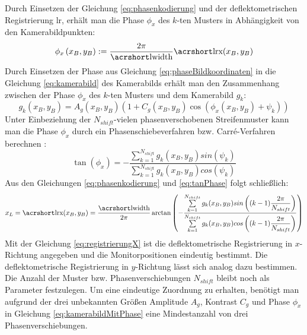 \p
Durch Einsetzen der Gleichung \ref{eq:phasenkodierung} und der deflektometrischen Registrierung \acrshort{lr}, erhält man die Phase $\phi_x$ des $k$-ten Musters in Abhängigkeit von den Kamerabildpunkten:
%
\begin{equation}\label{eq:phaseBildkoordinaten}
	\phi_x\left(x_B,y_B\right) := \dfrac{2\pi}{\acrshortmath{lwidth}}\acrshortmath{lrx}(x_B, y_B)
\end{equation}
%
Durch Einsetzen der Phase aus Gleichung \ref{eq:phaseBildkoordinaten} in die Gleichung \ref{eq:kamerabild} des Kamerabilds erhält man den Zusammenhang zwischen der Phase $\phi_x$ des $k$-ten Musters und dem Kamerabild $g_k$:
%
\begin{equation}\label{eq:kamerabildMitPhase}
	g_k(x_B, y_B) = A_g(x_B, y_B) \left(1 + C_g(x_B, y_B) \cos \left(\phi_x(x_B, y_B) + \psi_k\right)\right)
\end{equation}
%
Unter Einbeziehung der $N_{shift}$-vielen phasenverschobenen Streifenmuster kann man die Phase $\phi_x$ durch ein Phasenschiebeverfahren bzw. Carré-Verfahren berechnen \cite{carre}\cite{kit_werling}:
%
\begin{equation}\label{eq:tanPhase}
	\tan (\phi_x) = -\dfrac{\sum\limits_{k=1}^{N_{shift}} g_k(x_B, y_B) sin(\psi_k)}{\sum\limits_{k=1}^{N_{shift}} g_k(x_B, y_B) cos(\psi_k)}
\end{equation}
%
Aus den Gleichungen \ref{eq:phasenkodierung} und \ref{eq:tanPhase} folgt schließlich:
%
\begin{equation}\label{eq:registrierungX}
	x_L = \acrshortmath{lrx}(x_B, y_B) = 
	\dfrac{\acrshortmath{lwidth}}{2\pi}
	\arctan 
	\left( 
		-\dfrac
		{\sum\limits_{k=1}^{N_{shift}} g_k(x_B, y_B) sin\left((k - 1)\dfrac{2\pi}{N_{shift}}\right)}
		{\sum\limits_{k=1}^{N_{shift}} g_k(x_B, y_B) cos\left((k - 1)\dfrac{2\pi}{N_{shift}}\right)}
	\right)
\end{equation}
%
Mit der Gleichung \ref{eq:registrierungX} ist die deflektometrische Registrierung in $x$-Richtung angegeben und die Monitorpositionen eindeutig bestimmt.
Die deflektometrische Registrierung in $y$-Richtung lässt sich analog dazu bestimmen.
Die Anzahl der Muster bzw. Phasenverschiebungen $N_{shift}$ bleibt noch als Parameter festzulegen.
Um eine eindeutige Zuordnung zu erhalten, benötigt man aufgrund der drei unbekannten Größen Amplitude $A_g$, Kontrast $C_g$ und Phase $\phi_x$ in Gleichung \ref{eq:kamerabildMitPhase} eine Mindestanzahl von drei Phasenverschiebungen.

